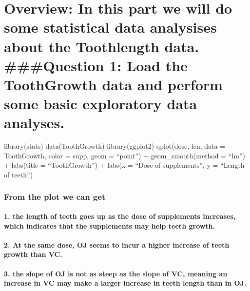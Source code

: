 \documentclass[
]{article}
\begin{document}
\hypertarget{overview-in-this-part-we-will-do-some-statistical-data-analysises-about-the-toothlength-data.-question-1-load-the-toothgrowth-data-and-perform-some-basic-exploratory-data-analyses.}{%
\section{Overview: In this part we will do some statistical data
analysises about the Toothlength data. \#\#\#Question 1: Load the
ToothGrowth data and perform some basic exploratory data
analyses.}\label{overview-in-this-part-we-will-do-some-statistical-data-analysises-about-the-toothlength-data.-question-1-load-the-toothgrowth-data-and-perform-some-basic-exploratory-data-analyses.}}

library(stats) data(ToothGrowth) library(ggplot2) qplot(dose, len, data
= ToothGrowth, color = supp, geom = ``point'') + geom\_smooth(method =
``lm'') + labs(title = ``ToothGrowth'') + labs(x = ``Dose of
supplements'', y = ``Length of teeth'')

\hypertarget{from-the-plot-we-can-get}{%
\subsubsection{From the plot we can
get}\label{from-the-plot-we-can-get}}

\hypertarget{the-length-of-teeth-goes-up-as-the-dose-of-supplements-increases-which-indicates-that-the-supplements-may-help-teeth-growth.}{%
\paragraph{1. the length of teeth goes up as the dose of supplements
increases, which indicates that the supplements may help teeth
growth.}\label{the-length-of-teeth-goes-up-as-the-dose-of-supplements-increases-which-indicates-that-the-supplements-may-help-teeth-growth.}}

\hypertarget{at-the-same-dose-oj-seems-to-incur-a-higher-increase-of-teeth-growth-than-vc.}{%
\paragraph{2. At the same dose, OJ seems to incur a higher increase of
teeth growth than
VC.}\label{at-the-same-dose-oj-seems-to-incur-a-higher-increase-of-teeth-growth-than-vc.}}

\hypertarget{the-slope-of-oj-is-not-as-steep-as-the-slope-of-vc-meaning-an-increase-in-vc-may-make-a-larger-increase-in-teeth-length-than-in-oj.}{%
\paragraph{3. the slope of OJ is not as steep as the slope of VC,
meaning an increase in VC may make a larger increase in teeth length
than in
OJ.}\label{the-slope-of-oj-is-not-as-steep-as-the-slope-of-vc-meaning-an-increase-in-vc-may-make-a-larger-increase-in-teeth-length-than-in-oj.}}
\end{document}
